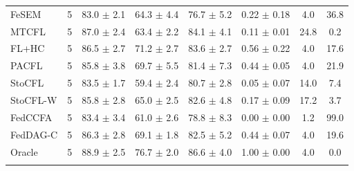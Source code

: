 {\begin{tabular}{l r c c c c c c}
FeSEM & 5 & 83.0 $\pm$ 2.1 & 64.3 $\pm$ 4.4 & 76.7 $\pm$ 5.2 & 0.22 $\pm$ 0.18 & 4.0 & 36.8 \\
MTCFL & 5 & 87.0 $\pm$ 2.4 & 63.4 $\pm$ 2.2 & 84.1 $\pm$ 4.1 & 0.11 $\pm$ 0.01 & 24.8 & 0.2 \\
FL+HC & 5 & 86.5 $\pm$ 2.7 & 71.2 $\pm$ 2.7 & 83.6 $\pm$ 2.7 & 0.56 $\pm$ 0.22 & 4.0 & 17.6 \\
PACFL & 5 & 85.8 $\pm$ 3.8 & 69.7 $\pm$ 5.5 & 81.4 $\pm$ 7.3 & 0.44 $\pm$ 0.05 & 4.0 & 21.9 \\
StoCFL & 5 & 83.5 $\pm$ 1.7 & 59.4 $\pm$ 2.4 & 80.7 $\pm$ 2.8 & 0.05 $\pm$ 0.07 & 14.0 & 7.4 \\
StoCFL-W & 5 & 85.8 $\pm$ 2.8 & 65.0 $\pm$ 2.5 & 82.6 $\pm$ 4.8 & 0.17 $\pm$ 0.09 & 17.2 & 3.7 \\
FedCCFA & 5 & 83.4 $\pm$ 3.4 & 61.0 $\pm$ 2.6 & 78.8 $\pm$ 8.3 & 0.00 $\pm$ 0.00 & 1.2 & 99.0 \\
FedDAG-C & 5 & 86.3 $\pm$ 2.8 & 69.1 $\pm$ 1.8 & 82.5 $\pm$ 5.2 & 0.44 $\pm$ 0.07 & 4.0 & 19.6 \\
Oracle & 5 & 88.9 $\pm$ 2.5 & 76.7 $\pm$ 2.0 & 86.6 $\pm$ 4.0 & 1.00 $\pm$ 0.00 & 4.0 & 0.0 \\
\addlinespace
\bottomrule
\end{tabular}
}

